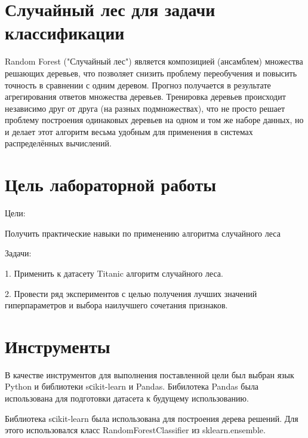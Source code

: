 \documentclass[a4paper,12pt]{article}
\begin{document}
\begin{titlepage}
\newpage

\end{titlepage}

\newpage
\tableofcontents
\setcounter{page}{2}


\newpage\section{Случайный лес для задачи классификации} 
	Random Forest ("Случайный лес") является композицией (ансамблем) множества решающих деревьев, что позволяет снизить проблему переобучения и повысить точность в сравнении с одним деревом. Прогноз получается в результате агрегирования ответов множества деревьев. Тренировка деревьев происходит независимо друг от друга (на разных подмножествах), что не просто решает проблему построения одинаковых деревьев на одном и том же наборе данных, но и делает этот алгоритм весьма удобным для применения в системах распределённых вычислений.
	
	\vspace{0.5cm}
	
	
	
\newpage\section{Цель лабораторной работы} 
	Цели: 
	\vspace{0.5cm}
	
	Получить практические навыки по применению алгоритма случайного леса
	
	\vspace{0.1cm}
	Задачи: 
	
	\vspace{0.1cm}
	1. Применить к датасету Titanic алгоритм случайного леса.
	
	\vspace{0.1cm}
	2. Провести ряд экспериментов с целью получения лучших значений гиперпараметров и выбора наилучшего сочетания признаков.
	
	
\newpage\section{Инструменты} 
	В качестве инструментов для выполнения поставленной цели был выбран язык Python и библиотеки sсikit-learn и Pandas.
	Бибилотека Pandas была использована для подготовки датасета к будущему использованию.
	
	\vspace{0.5cm}
	Библиотека sсikit-learn была использована для построения дерева решений. Для этого использовался класс RandomForestClassifier из sklearn.ensemble. 
	
\end{document}
